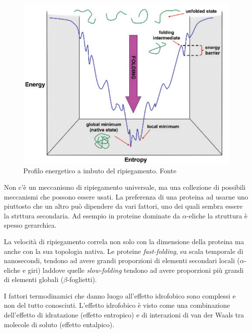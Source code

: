 {{\begin{figure}[!htb]
	\centering
	\includegraphics[scale=0.6]{images/imbuto.png}
	\caption{Profilo energetico a imbuto del ripiegamento. Fonte \cite{kessel_ben-tal_2018}}
	\label{fig:imbuto}
\end{figure}

Non c'è un meccanismo di ripiegamento universale, ma una collezione di possibili meccanismi che possono essere usati. La preferenza di una proteina ad usarne uno piuttosto che un altro può dipendere da vari fattori, uno dei quali sembra essere la strttura secondaria. Ad esempio in proteine dominate da $\alpha$-eliche la struttura è spesso gerarchica. 

\par La velocità di ripiegamento correla non solo con la dimensione della proteina ma anche con la sua topologia nativa. Le proteine \textit{fast-folding}, su scala temporale di nanosecondi, tendono ad avere grandi proporzioni di elementi secondari locali ($\alpha$-eliche e giri) laddove quelle \textit{slow-folding} tendono ad avere proporzioni più grandi di elementi globali ($\beta$-foglietti).

\par I fattori termodinamici che danno luogo all’effetto idrofobico sono complessi e non del tutto conosciuti. L’effetto idrofobico è visto come una combinazione dell’effetto di idratazione (effetto entropico) e di interazioni di van der Waals tra molecole di soluto (effetto entalpico).

}
	
}
